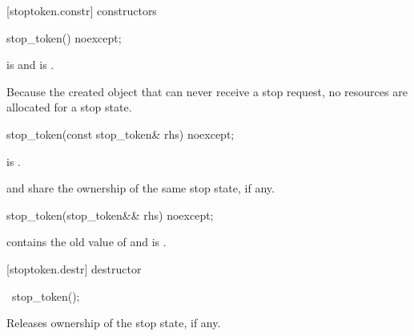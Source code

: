 {%
[stoptoken.constr]{ constructors}

%
\begin{itemdecl}
stop_token() noexcept;
\end{itemdecl}
\begin{itemdescr}
  \pnum\postconditions {} is  and 
                        is .
        \begin{note} Because the created  object that can never receive a stop request,
                     no resources are allocated for a stop state.  \end{note}

\end{itemdescr}


%
\begin{itemdecl}
stop_token(const stop_token& rhs) noexcept;
\end{itemdecl}
\begin{itemdescr}
  \pnum\postconditions {} is .
        \begin{note}  and  share the ownership of the
                        same stop state, if any.  \end{note}
\end{itemdescr}

%
\begin{itemdecl}
stop_token(stop_token&& rhs) noexcept;
\end{itemdecl}
\begin{itemdescr}
  \pnum\postconditions {} contains the old value of  and
                         is .
\end{itemdescr}

[stoptoken.destr]{ destructor}

%
\begin{itemdecl}
~stop_token();
\end{itemdecl}

\begin{itemdescr}
 \pnum\effects Releases ownership of the stop state, if any.
\end{itemdescr}

}
